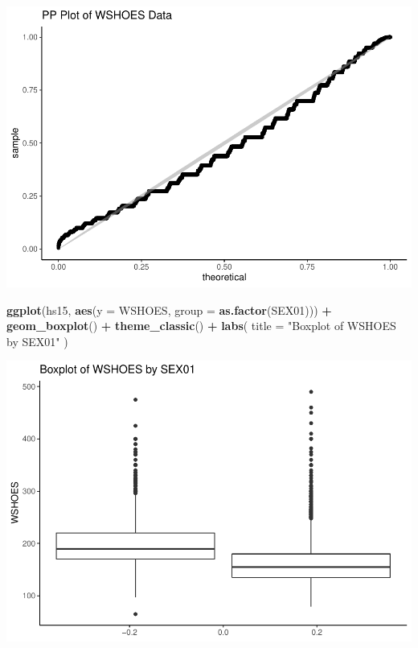 \documentclass[]{article}
\newenvironment{Shaded}{\begin{snugshade}}{\end{snugshade}}
\newcommand{\DataTypeTok}[1]{\textcolor[rgb]{0.13,0.29,0.53}{#1}}
\newcommand{\KeywordTok}[1]{\textcolor[rgb]{0.13,0.29,0.53}{\textbf{#1}}}
\newcommand{\NormalTok}[1]{#1}
\newcommand{\OperatorTok}[1]{\textcolor[rgb]{0.81,0.36,0.00}{\textbf{#1}}}
\newcommand{\StringTok}[1]{\textcolor[rgb]{0.31,0.60,0.02}{#1}}
\begin{document}
\includegraphics{assignment2_files/figure-latex/q7-3.pdf}

\begin{Shaded}
\begin{Highlighting}[]
\KeywordTok{ggplot}\NormalTok{(hs15, }\KeywordTok{aes}\NormalTok{(}\DataTypeTok{y =}\NormalTok{ WSHOES, }\DataTypeTok{group =} \KeywordTok{as.factor}\NormalTok{(SEX01))) }\OperatorTok{+}
\StringTok{  }\KeywordTok{geom_boxplot}\NormalTok{() }\OperatorTok{+}
\StringTok{  }\KeywordTok{theme_classic}\NormalTok{() }\OperatorTok{+}
\StringTok{  }\KeywordTok{labs}\NormalTok{(}
    \DataTypeTok{title =} \StringTok{"Boxplot of WSHOES by SEX01"}
\NormalTok{  )}
\end{Highlighting}
\end{Shaded}

\includegraphics{assignment2_files/figure-latex/q7-4.pdf}
\end{document}
